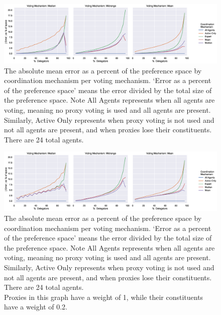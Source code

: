 \begin{landscape}
    \begin{figure}[p]
        \centering
        \includegraphics[scale=0.55]
        {content/chapter2/figures/vm_col_cm_hue_error_as_percent_of_space_abs_mean}
        \caption{
            The absolute mean error as a percent of the preference space by
            coordination mechanism per voting mechanism.
            `Error as a percent of the preference space' means the error divided by
            the total size of the preference space.
            Note All Agents represents when all agents are voting, meaning no proxy
            voting is used and all agents are present.
            Similarly, Active Only represents when proxy voting is not used and not
            all agents are present, and when proxies lose their constituents.
            There are 24 total agents.
        }
        \label{fig:\chptindicator-vm-col-cm-hue-error-as-percent-of-space-abs-mean}
    \end{figure}

    \begin{figure}[p]
        \centering
        \includegraphics[scale=0.55]
        {content/chapter2/figures/different_weight/vm_col_cm_hue_error_as_percent_of_space_abs_mean}
        \caption{
            The absolute mean error as a percent of the preference space by
            coordination mechanism per voting mechanism.
            `Error as a percent of the preference space' means the error divided by
            the total size of the preference space.
            Note All Agents represents when all agents are voting, meaning no proxy
            voting is used and all agents are present.
            Similarly, Active Only represents when proxy voting is not used and not
            all agents are present, and when proxies lose their constituents.
            There are 24 total agents.
            \\
            Proxies in this graph have a weight of 1, while their constituents have a
            weight of 0.2.
        }
        \label{fig:\chptindicator-different-weight-vm-col-cm-hue-error-as-percent-of-space-abs-mean}
    \end{figure}
\end{landscape}

